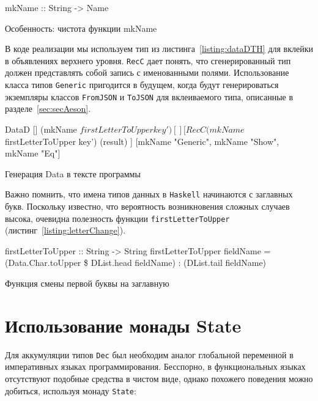 \begin{ListingEnv}[H]
\begin{Verb}
mkName :: String -> Name
\end{Verb}
\caption{Особенность: чистота функции mkName}
\label{listing:mkName}
\end{ListingEnv} 

В коде реализации мы используем тип из листинга~\ref{listing:dataDTH} для вклейки в объявлениях верхнего уровня. \lstinline{RecC} дает понять, что сгенерированный тип должен представлять собой запись с именованными полями. Использование класса типов \lstinline{Generic} пригодится в будущем, когда будут генерироваться экземпляры классов \lstinline{FromJSON} и \lstinline{ToJSON} для вклеиваемого типа, описанные в разделе~\ref{sec:secAeson}.

\begin{ListingEnv}[H]
\begin{Verb}
DataD
     []
     (mkName $ firstLetterToUpper key')
     []
     [ RecC (mkName $ firstLetterToUpper key')  (result) ]
     [mkName "Generic", mkName "Show", mkName "Eq"]
\end{Verb}
\caption{Генерация Data в тексте программы}
\label{listing:dataDTHjson}
\end{ListingEnv} 

Важно помнить, что имена типов данных в \lstinline{Haskell} начинаются с заглавных букв. Поскольку известно, что вероятность возникновения сложных случаев высока, очевидна полезность функции \lstinline{firstLetterToUpper} (листинг~\ref{listing:letterChange}).

\begin{ListingEnv}[H]
\begin{Verb}
firstLetterToUpper :: String -> String
firstLetterToUpper fieldName = (Data.Char.toUpper 
                                         \$ DList.head fieldName)
                                         : (DList.tail fieldName)
\end{Verb}
\caption{Функция смены первой буквы на заглавную}
\label{listing:letterChange}
\end{ListingEnv} 

\section{Использование монады State}

Для аккумуляции типов \lstinline{Dec} был необходим аналог глобальной переменной в императивных языках программирования. Бесспорно, в функциональных языках отсутствуют подобные средства в чистом виде, однако похожего поведения можно добиться, используя монаду \lstinline{State}:

